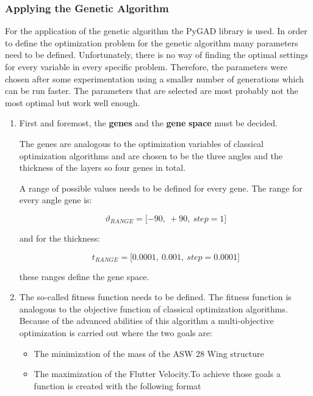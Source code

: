 \subsubsection{Applying the Genetic Algorithm}
\label{applying-the-genetic-algorithm}

For the application of the genetic algorithm the PyGAD \cite{gad2023pygad} library
is used. In order to define the optimization problem for the genetic
algorithm many parameters need to be defined. Unfortunately, there is no
way of finding the optimal settings for every variable in every specific
problem. Therefore, the parameters were chosen after some
experimentation using a smaller number of generations which can be run
faster. The parameters that are selected are most probably not the most
optimal but work well enough.

\begin{enumerate}
\def\labelenumi{\arabic{enumi}.}
\item
  First and foremost, the \textbf{genes} and the \textbf{gene}
  \textbf{space} must be decided.

The genes are analogous to the optimization variables of classical
optimization algorithms and are chosen to be the three angles and the
thickness of the layers so four genes in total.

A range of possible values needs to be defined for every gene. The range
for every angle gene is:

\[\vartheta_{RANGE} = \lbrack - 90,\  + 90,\ step = 1\rbrack\]

and for the thickness:

\[t_{RANGE} = \lbrack 0.0001,\ 0.001,\ step = 0.0001\rbrack\]

these ranges define the gene space.

\item
  The so-called fitness function needs to be defined. The fitness
  function is analogous to the objective function of classical
  optimization algorithms. Because of the advanced abilities of this
  algorithm a multi-objective optimization is carried out where the two
  goals are:

  \begin{itemize}
  \item
    The minimization of the mass of the ASW 28 Wing structure
  \item
    The maximization of the Flutter Velocity.To achieve those goals a
    function is created with the following format
  \end{itemize}


\end{enumerate}
